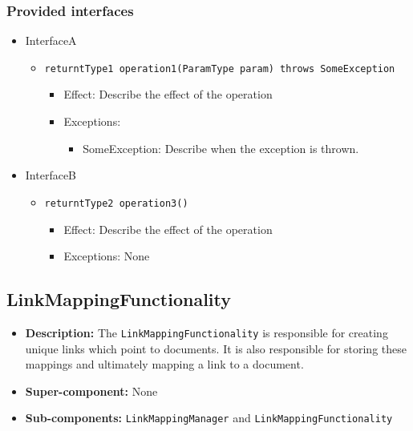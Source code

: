 \documentclass[a4paper,10pt]{article}
\begin{document}
\subsubsection*{Provided interfaces}
\begin{itemize}
    \item InterfaceA
    \begin{itemize}
        \item \texttt{returntType1 operation1(ParamType param) throws SomeException}
        \begin{itemize}
            \item Effect: Describe the effect of the operation
            \item Exceptions:
            \begin{itemize}
                \item SomeException: Describe when the exception is thrown.
            \end{itemize}
        \end{itemize}
    \end{itemize}

    \item InterfaceB
    \begin{itemize}
        \item \texttt{returntType2 operation3()}
        \begin{itemize}
            \item Effect: Describe the effect of the operation
            \item Exceptions: None
        \end{itemize}
    \end{itemize}
\end{itemize}

\subsection{LinkMappingFunctionality}
\begin{itemize}
    \item \textbf{Description:} The \texttt{LinkMappingFunctionality} is responsible for creating unique links which point to documents. It is also responsible for storing these mappings and ultimately mapping a link to a document.
    \item \textbf{Super-component:} None
    \item \textbf{Sub-components:} \texttt{LinkMappingManager} and \texttt{LinkMappingFunctionality}
\end{itemize}
\end{document}
